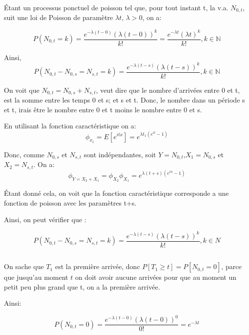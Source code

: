 \documentclass[a4paper]{article}
\begin{document}
Étant un processus ponctuel de poisson tel que, pour tout instant t, la v.a. $N_{0,t}$,
suit une loi de Poisson de paramètre $\lambda t$, $\lambda >0$, on a:

\begin{equation*}
P(N_{0,t}=k)=\frac{e^{-\lambda (t-0)}(\lambda (t-0))^k}{k!}=\frac{e^{-\lambda t}(\lambda t)^k}{k!} , k \in \mathbb{N}
\end{equation*}

Ainsi,
\begin{equation*}
P(N_{0,t}-N_{0,s}=N_{s,t}=k)=\frac{e^{-\lambda (t-s)}(\lambda (t-s))^k}{k!} , k \in \mathbb{N}
\end{equation*}

On voit que $N_{0,t}=N_{0,s}+N_{s,t}$, veut dire que le nombre d'arrivées entre 0
et t, est  la somme entre les temps 0 et  s; et s et t. Donc,  le nombre dans un
période s et t, irais être le nombre entre 0 et t moins le nombre entre 0 et s.

En utilisant la fonction caractéristique on a:
\begin{equation}
\phi_{x_1}=E[e^{itx}]=e^{\lambda t_1(e^{it}-1)}
\end{equation}

Donc,    comme     $N_{0,s}$    et    $N_{s,t}$     sont    indépendantes,    soit
$Y=N_{0,t}$,$X_1=N_{0,s}$ et $X_2=N_{s,t}$. On a:
\begin{equation*}
\phi_{Y=X_2+X_1}=\phi_{X_2}\phi_{X_1}=e^{\lambda (t+s)(e^{in}-1)}
\end{equation*}

Étant donné cela, on voit que la fonction caractéristique corresponde a une 
fonction de poisson avec les paramètres t+s.

Ainsi, on peut vérifier que :

\begin{equation}
P(N_{0,t}-N_{0,s}=N_{s,t}=k)=\frac{e^{-\lambda (t-s)}(\lambda (t-s))^k}{k!} , k \in N
\end{equation}


\subsection{}
On sache que $T_1$ est la première arrivée, donc $P[T_1\geq t]=P[N_{0,t}=0]$, parce
que jusqu'au moment $t$ on doit avoir  aucune arrivées pour que au moment un petit
peu plus grand que t, on a la première arrivée.

Ainsi:

\begin{equation*}
P(N_{0,t}=0)=\frac{e^{-\lambda (t-0)}(\lambda (t-0))^0}{0!}=e^{-\lambda t} 
\end{equation*}
\end{document}
